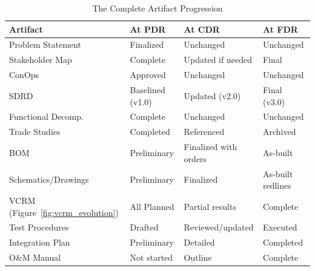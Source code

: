 \begin{table}[htbp]\centering\small
\caption{The Complete Artifact Progression}
\begin{tabularx}{\textwidth}{l X X X}
\toprule
\textbf{Artifact} & \textbf{At PDR} & \textbf{At CDR} & \textbf{At FDR} \\
\midrule
Problem Statement & Finalized & Unchanged & Unchanged \\
Stakeholder Map & Complete & Updated if needed & Final \\
ConOps & Approved & Unchanged & Unchanged \\
SDRD & Baselined (v1.0) & Updated (v2.0) & Final (v3.0) \\
Functional Decomp.\ & Complete & Unchanged & Unchanged \\
Trade Studies & Completed & Referenced & Archived \\
BOM & Preliminary & Finalized with orders & As-built \\
Schematics/Drawings & Preliminary & Finalized & As-built redlines \\
VCRM (Figure~\ref{fig:vcrm_evolution}) & All Planned & Partial results & Complete \\
Test Procedures & Drafted & Reviewed/updated & Executed \\
Integration Plan & Preliminary & Detailed & Completed \\
O\&M Manual & Not started & Outline & Complete \\
\bottomrule
\end{tabularx}
\end{table}


